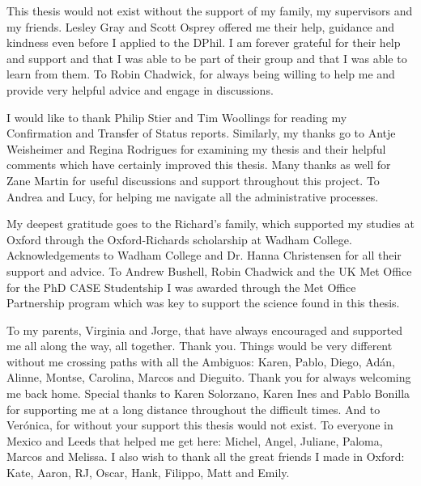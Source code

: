 
This thesis would not exist without the support of my family, my supervisors and my friends. 
Lesley Gray and Scott Osprey offered me their help, guidance and kindness even before I applied to the DPhil. I am forever grateful for their help and support and that I was able to be part of their group and that I was able to learn from them.
To Robin Chadwick, for always being willing to help me and provide very helpful advice and engage in discussions.

I would like to thank Philip Stier and Tim Woollings for reading my Confirmation and Transfer of Status reports. Similarly, my thanks go to Antje Weisheimer and Regina Rodrigues for examining my thesis and their helpful comments which have certainly improved this thesis. 
Many thanks as well for Zane Martin for useful discussions and support throughout this project.
To Andrea and Lucy, for helping me navigate all the administrative processes.

My deepest gratitude goes to the Richard's family, which supported my studies at Oxford through the Oxford-Richards scholarship at Wadham College. Acknowledgements to Wadham College and Dr. Hanna Christensen for all their support and advice. 
To Andrew Bushell, Robin Chadwick and the UK Met Office for the PhD CASE Studentship I was awarded through the Met Office Partnership program which was key to support the science found in this thesis. 


To my parents, Virginia and Jorge, that have always encouraged and supported me all along the way, all together. Thank you. 
Things would be very different without me crossing paths with all the Ambiguos: Karen, Pablo, Diego, Adán, Alinne, Montse, Carolina, Marcos and Dieguito. Thank you for always welcoming me back home. 
Special thanks to Karen Solorzano, Karen Ines and Pablo Bonilla for supporting me at a long distance throughout the difficult times. 
And to Ver\'onica, for without your support this thesis would not exist. 
To everyone in Mexico and Leeds that helped me get here: Michel, Angel, Juliane, Paloma, Marcos and Melissa.  
 I also wish to thank all the great friends I made in Oxford: Kate, Aaron, RJ, Oscar, Hank, Filippo, Matt and Emily. 





